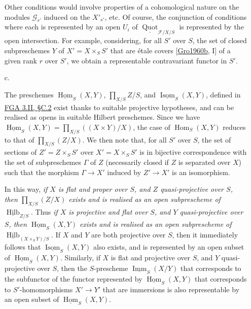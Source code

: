 \begin{enumerate}
      Other conditions would involve properties of a cohomological nature on the modules \(\mathscr {G}_{s'}\) induced on the \(X'_{s'}\), etc.
      Of course, the conjunction of conditions where each is represented by an open \(U_i\) of \(\underline {\operatorname {Quot}}_{{\mathscr {F}/X/S}}\) is represented by the open intersection.
      For example, considering, for all \(S'\) over \(S\), the set of closed subpreschemes \(Y\) of \(X'=X\times _S S'\) that are étale covers [\hyperref[Gro1960b]{Gro1960b}, I] of a given rank \(r\) over \(S'\), we obtain a representable contravariant functor in \(S'\).
  


  
 \item[c.]
    \par{}The preschemes \(\underline {\operatorname {Hom}}_S(X,Y)\), \(\prod _{X/S}Z/S\), and \(\underline {\operatorname {Isom}}_S(X,Y)\), defined in \hyperref[fga3.ii-c.2]{FGA 3.II, §C.2} exist thanks to suitable projective hypotheses, and can be realised as opens in suitable Hilbert preschemes.
      Since we have \(\underline {\operatorname {Hom}}_S(X,Y)=\prod _{X/S}((X\times  Y)/X)\), the case of \(\operatorname {Hom}_S(X,Y)\) reduces to that of \(\prod _{X/S}(Z/X)\).
      We then note that, for all \(S'\) over \(S\), the set of sections of \(Z'=Z\times _S S'\) over \(X'=X\times _S S'\) is in bijective correspondence with the set of subpreschemes \(\Gamma \) of \(Z\) (necessarily closed if \(Z\) is separated over \(X\)) such that the morphism \(\Gamma \to  X'\) induced by \(Z'\to  X'\) is an isomorphism.
      
      In this way, \emph{if \(X\) is flat and proper over \(S\), and \(Z\) quasi-projective over \(S\), then \(\prod _{X/S}(Z/X)\) exists and is realised as an open subprescheme of \(\underline {\operatorname {Hilb}}_{Z/S}\)}.
      Thus \emph{if \(X\) is projective and flat over \(S\), and \(Y\) quasi-projective over \(S\), then \(\underline {\operatorname {Hom}}_S(X,Y)\) exists and is realised as an open subprescheme of \(\underline {\operatorname {Hilb}}_{(X\times _S Y)/S}\)}.
      If \(X\) and \(Y\) are both projective over \(S\), then it immediately follows that \(\underline {\operatorname {Isom}}_S(X,Y)\) also exists, and is represented by an open subset of \(\underline {\operatorname {Hom}}_S(X,Y)\).
      Similarly, if \(X\) is flat and projective over \(S\), and \(Y\) quasi-projective over \(S\), then the \(S\)-prescheme \(\underline {\operatorname {Imm}}_S(X/Y)\) that corresponds to the subfunctor of the functor represented by \(\underline {\operatorname {Hom}}_S(X,Y)\) that corresponds to \(S'\)-homomorphisms \(X'\to  Y'\) that are immersions is also representable by an open subset of \(\underline {\operatorname {Hom}}_S(X,Y)\).


\end{enumerate}
